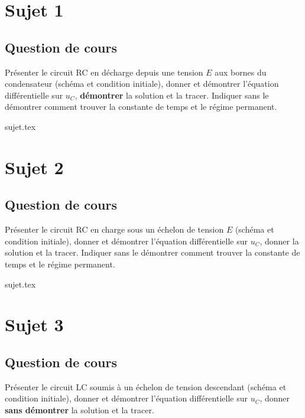 \documentclass[a4paper, 11pt]{book}
\begin{document}
\resetQ
\newpage

\chapter{Sujet 1}
\section{Question de cours}

Présenter le circuit RC en décharge depuis une tension $E$ aux bornes du
condensateur (schéma et condition initiale), donner et démontrer l'équation
différentielle sur $u_C$, \textbf{démontrer} la solution et la tracer. Indiquer
sans le démontrer comment trouver la constante de temps et le régime permanent.

\resetQ

{sujet.tex}

\resetQ
\newpage

\chapter{Sujet 2}
\section{Question de cours}

Présenter le circuit RC en charge sous un échelon de tension $E$ (schéma et
condition initiale), donner et démontrer l'équation différentielle sur $u_C$,
donner la solution et la tracer. Indiquer sans le démontrer comment trouver la
constante de temps et le régime permanent.

{sujet.tex}

\resetQ
\newpage

\chapter{Sujet 3}
\section{Question de cours}

Présenter le circuit LC soumis à un échelon de tension descendant (schéma et
condition initiale), donner et démontrer l'équation différentielle sur $u_C$,
donner \textbf{sans démontrer} la solution et la tracer.
\end{document}
